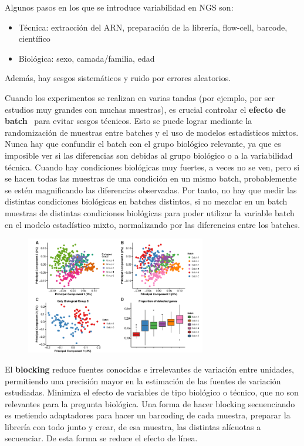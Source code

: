 Algunos pasos en los que se introduce variabilidad en NGS son:
\begin{itemize}
\item Técnica: extracción del ARN, preparación de la librería, flow-cell, barcode, científico
\item Biológica: sexo, camada/familia, edad
\end{itemize}
Además, hay sesgos sistemáticos y ruido por errores aleatorios.

Cuando los experimentos se realizan en varias tandas (por ejemplo, por ser estudios muy grandes con muchas muestras), es crucial controlar el \textbf{efecto de batch} \marginpar[\footnotesize !!!!!]  \ para evitar sesgos técnicos. Esto se puede lograr mediante la randomización de muestras entre batches y el uso de modelos estadísticos mixtos.
Nunca hay que confundir el batch con el grupo biológico relevante, ya que es imposible ver si las diferencias son debidas al grupo biológico o a la variabilidad técnica. Cuando hay condiciones biológicas muy fuertes, a veces no se ven, pero si se hacen todas las muestras de una condición en un mismo batch, probablemente se estén magnificando las diferencias observadas. Por tanto, no hay que medir las distintas condiciones biológicas en batches distintos, si no mezclar en un batch muestras de distintas condiciones biológicas para poder utilizar la variable batch en el modelo estadístico mixto, normalizando por las diferencias entre los batches.

\begin{figure}[h]
\centering
\includegraphics[width = 0.7\textwidth]{figs/batch.png}
\end{figure}

El \textbf{blocking} reduce fuentes conocidas e irrelevantes de variación entre unidades, permitiendo una precisión mayor en la estimación de las fuentes de variación estudiadas. Minimiza el efecto de variables de tipo biológico o técnico, que no son relevantes para la pregunta biológica. Una forma de hacer blocking secuenciando es metiendo adaptadores para hacer un barcoding de cada muestra, preparar la librería con todo junto y crear, de esa muestra, las distintas alícuotas a secuenciar. De esta forma se reduce el efecto de línea.

